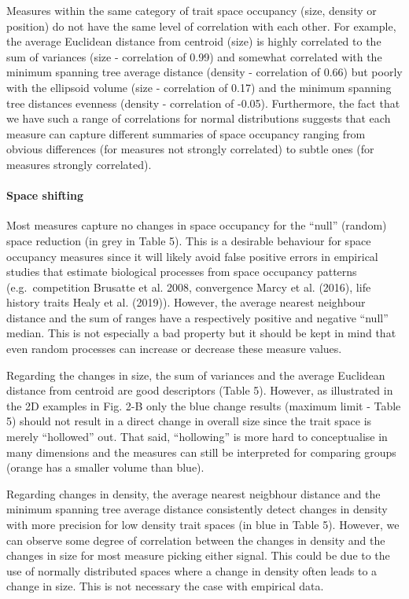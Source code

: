 \documentclass[]{article}
\let\oldparagraph\paragraph
\renewcommand{\paragraph}[1]{\oldparagraph{#1}\mbox{}}
\begin{document}
Measures within the same category of trait space occupancy (size,
density or position) do not have the same level of correlation with each
other. For example, the average Euclidean distance from centroid (size)
is highly correlated to the sum of variances (size - correlation of
0.99) and somewhat correlated with the minimum spanning tree average
distance (density - correlation of 0.66) but poorly with the ellipsoid
volume (size - correlation of 0.17) and the minimum spanning tree
distances evenness (density - correlation of -0.05). Furthermore, the
fact that we have such a range of correlations for normal distributions
suggests that each measure can capture different summaries of space
occupancy ranging from obvious differences (for measures not strongly
correlated) to subtle ones (for measures strongly correlated).

\paragraph{Space shifting}\label{space-shifting-1}

Most measures capture no changes in space occupancy for the ``null''
(random) space reduction (in grey in Table 5). This is a desirable
behaviour for space occupancy measures since it will likely avoid false
positive errors in empirical studies that estimate biological processes
from space occupancy patterns (e.g.~competition Brusatte et al. 2008,
convergence Marcy et al. (2016), life history traits Healy et al.
(2019)). However, the average nearest neighbour distance and the sum of
ranges have a respectively positive and negative ``null'' median. This
is not especially a bad property but it should be kept in mind that even
random processes can increase or decrease these measure values.

Regarding the changes in size, the sum of variances and the average
Euclidean distance from centroid are good descriptors (Table 5).
However, as illustrated in the 2D examples in Fig. 2-B only the blue
change results (maximum limit - Table 5) should not result in a direct
change in overall size since the trait space is merely ``hollowed'' out.
That said, ``hollowing'' is more hard to conceptualise in many
dimensions and the measures can still be interpreted for comparing
groups (orange has a smaller volume than blue).

Regarding changes in density, the average nearest neigbhour distance and
the minimum spanning tree average distance consistently detect changes
in density with more precision for low density trait spaces (in blue in
Table 5). However, we can observe some degree of correlation between the
changes in density and the changes in size for most measure picking
either signal. This could be due to the use of normally distributed
spaces where a change in density often leads to a change in size. This
is not necessary the case with empirical data.
\end{document}
